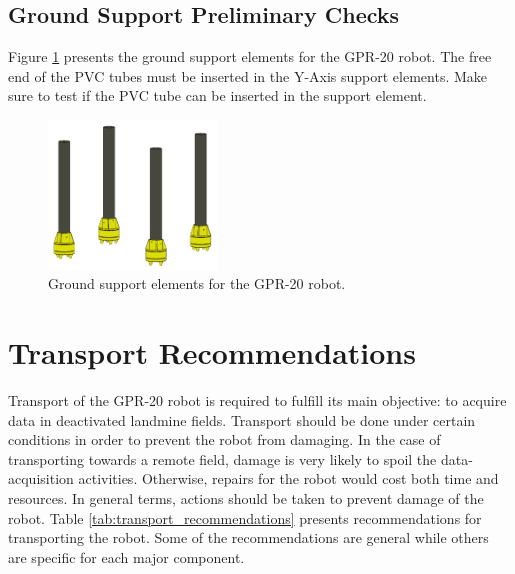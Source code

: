 \documentclass{article}
\begin{document}
\subsection{Ground Support Preliminary Checks}
Figure \ref{fig:considerations_ground_supports} presents the ground support elements for the GPR-20 robot. The free end of the PVC tubes must be inserted in the Y-Axis support elements. Make sure to test if the PVC tube can be inserted in the support element.
\begin{figure}[H]
    \centering
    \includegraphics[width=0.4\textwidth]{images/requirements/no_text_ground_supports.png}
    \caption{Ground support elements for the GPR-20 robot.}
    \label{fig:considerations_ground_supports}
\end{figure}

\newpage
\section{Transport Recommendations}
Transport of the GPR-20 robot is required to fulfill its main objective: to acquire data in deactivated landmine fields. Transport should be done under certain conditions in order to prevent the robot from damaging. In the case of transporting towards a remote field, damage is very likely to spoil the data-acquisition activities. Otherwise, repairs for the robot would cost both time and resources. In general terms, actions should be taken to prevent damage of the robot. Table \ref{tab:transport_recommendations} presents recommendations for transporting the robot. Some of the recommendations are general while others are specific for each major component.
\end{document}
